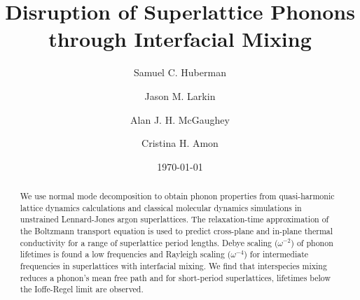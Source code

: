 \documentclass[aps,prb,preprint,preprintnumbers,amsmath,amssymb,floatfix,superscriptaddress]{revtex4}
\begin{document}
\title{Disruption of Superlattice Phonons through Interfacial Mixing}
\author{Samuel C. Huberman}
\author{Jason M. Larkin}
\author{Alan J. H. McGaughey}
\author{Cristina H. Amon}

\date{\today}%
\vspace{14mm}
  
\begin{abstract}

We use normal mode decomposition to obtain phonon properties from quasi-harmonic lattice dynamics calculations and classical molecular dynamics simulations in unstrained Lennard-Jones argon superlattices. The relaxation-time approximation of the Boltzmann transport equation is used to predict cross-plane and in-plane thermal conductivity for a range of superlattice period lengths. Debye scaling ($\omega^{-2}$) of phonon lifetimes is found a low frequencies and Rayleigh scaling ($\omega^{-4}$) for intermediate frequencies in superlattices with interfacial mixing. We find that interspecies mixing reduces a phonon's mean free path and for short-period superlattices, lifetimes below the Ioffe-Regel limit are observed.

\end{abstract}
\maketitle
\end{document}
